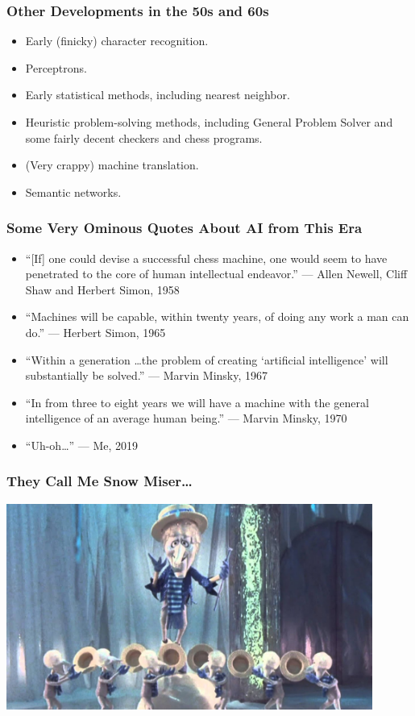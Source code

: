 \documentclass{beamer}
\begin{document}
  \begin{frame}
    \frametitle{Other Developments in the 50s and 60s}
    \begin{itemize}
      \item Early (finicky) character recognition.
      \pause
      \item Perceptrons.
      \pause
      \item Early statistical methods, including nearest neighbor.
      \pause
      \item Heuristic problem-solving methods, including General Problem
        Solver and some fairly decent checkers and chess programs.
      \pause
      \item (Very crappy) machine translation.
      \pause
      \item Semantic networks.
    \end{itemize}
  \end{frame}

  \begin{frame}
    \frametitle{Some Very Ominous Quotes About AI from This Era}

    \begin{itemize}
      \item ``[If] one could devise a successful chess machine, one would seem
        to have penetrated to the core of human intellectual endeavor.'' ---
        Allen Newell, Cliff Shaw and Herbert Simon, 1958
      \item ``Machines will be capable, within twenty years, of doing any work
        a man can do.'' --- Herbert Simon, 1965
      \item ``Within a generation \ldots the problem of creating `artificial
        intelligence' will substantially be solved.'' --- Marvin Minsky, 1967
      \item ``In from three to eight years we will have a machine with the
        general intelligence of an average human being.'' --- Marvin Minsky,
        1970
      \pause
      \item ``Uh-oh\ldots'' --- Me, 2019
    \end{itemize}
  \end{frame}

  \begin{frame}
    \frametitle{They Call Me Snow Miser\ldots}

    \includegraphics[width=0.9\textwidth]{snow-miser.jpg}
  \end{frame}
\end{document}
